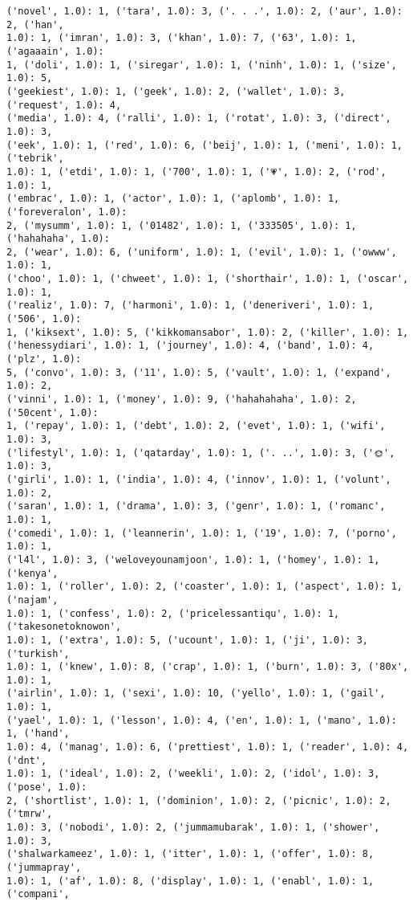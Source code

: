 \documentclass[11pt]{article}
\begin{document}
\begin{Verbatim}[commandchars=\\\{\}]
('novel', 1.0): 1, ('tara', 1.0): 3, ('. . .', 1.0): 2, ('aur', 1.0): 2, ('han',
1.0): 1, ('imran', 1.0): 3, ('khan', 1.0): 7, ('63', 1.0): 1, ('agaaain', 1.0):
1, ('doli', 1.0): 1, ('siregar', 1.0): 1, ('ninh', 1.0): 1, ('size', 1.0): 5,
('geekiest', 1.0): 1, ('geek', 1.0): 2, ('wallet', 1.0): 3, ('request', 1.0): 4,
('media', 1.0): 4, ('ralli', 1.0): 1, ('rotat', 1.0): 3, ('direct', 1.0): 3,
('eek', 1.0): 1, ('red', 1.0): 6, ('beij', 1.0): 1, ('meni', 1.0): 1, ('tebrik',
1.0): 1, ('etdi', 1.0): 1, ('700', 1.0): 1, ('💗', 1.0): 2, ('rod', 1.0): 1,
('embrac', 1.0): 1, ('actor', 1.0): 1, ('aplomb', 1.0): 1, ('foreveralon', 1.0):
2, ('mysumm', 1.0): 1, ('01482', 1.0): 1, ('333505', 1.0): 1, ('hahahaha', 1.0):
2, ('wear', 1.0): 6, ('uniform', 1.0): 1, ('evil', 1.0): 1, ('owww', 1.0): 1,
('choo', 1.0): 1, ('chweet', 1.0): 1, ('shorthair', 1.0): 1, ('oscar', 1.0): 1,
('realiz', 1.0): 7, ('harmoni', 1.0): 1, ('deneriveri', 1.0): 1, ('506', 1.0):
1, ('kiksext', 1.0): 5, ('kikkomansabor', 1.0): 2, ('killer', 1.0): 1,
('henessydiari', 1.0): 1, ('journey', 1.0): 4, ('band', 1.0): 4, ('plz', 1.0):
5, ('convo', 1.0): 3, ('11', 1.0): 5, ('vault', 1.0): 1, ('expand', 1.0): 2,
('vinni', 1.0): 1, ('money', 1.0): 9, ('hahahahaha', 1.0): 2, ('50cent', 1.0):
1, ('repay', 1.0): 1, ('debt', 1.0): 2, ('evet', 1.0): 1, ('wifi', 1.0): 3,
('lifestyl', 1.0): 1, ('qatarday', 1.0): 1, ('. ..', 1.0): 3, ('🌞', 1.0): 3,
('girli', 1.0): 1, ('india', 1.0): 4, ('innov', 1.0): 1, ('volunt', 1.0): 2,
('saran', 1.0): 1, ('drama', 1.0): 3, ('genr', 1.0): 1, ('romanc', 1.0): 1,
('comedi', 1.0): 1, ('leannerin', 1.0): 1, ('19', 1.0): 7, ('porno', 1.0): 1,
('l4l', 1.0): 3, ('weloveyounamjoon', 1.0): 1, ('homey', 1.0): 1, ('kenya',
1.0): 1, ('roller', 1.0): 2, ('coaster', 1.0): 1, ('aspect', 1.0): 1, ('najam',
1.0): 1, ('confess', 1.0): 2, ('pricelessantiqu', 1.0): 1, ('takesonetoknowon',
1.0): 1, ('extra', 1.0): 5, ('ucount', 1.0): 1, ('ji', 1.0): 3, ('turkish',
1.0): 1, ('knew', 1.0): 8, ('crap', 1.0): 1, ('burn', 1.0): 3, ('80x', 1.0): 1,
('airlin', 1.0): 1, ('sexi', 1.0): 10, ('yello', 1.0): 1, ('gail', 1.0): 1,
('yael', 1.0): 1, ('lesson', 1.0): 4, ('en', 1.0): 1, ('mano', 1.0): 1, ('hand',
1.0): 4, ('manag', 1.0): 6, ('prettiest', 1.0): 1, ('reader', 1.0): 4, ('dnt',
1.0): 1, ('ideal', 1.0): 2, ('weekli', 1.0): 2, ('idol', 1.0): 3, ('pose', 1.0):
2, ('shortlist', 1.0): 1, ('dominion', 1.0): 2, ('picnic', 1.0): 2, ('tmrw',
1.0): 3, ('nobodi', 1.0): 2, ('jummamubarak', 1.0): 1, ('shower', 1.0): 3,
('shalwarkameez', 1.0): 1, ('itter', 1.0): 1, ('offer', 1.0): 8, ('jummapray',
1.0): 1, ('af', 1.0): 8, ('display', 1.0): 1, ('enabl', 1.0): 1, ('compani',

\end{Verbatim}
\end{document}
